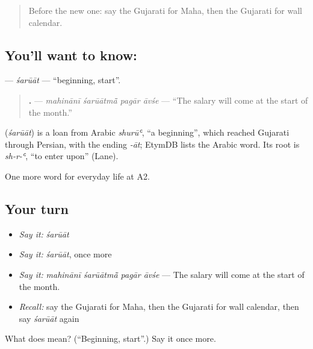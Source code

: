 \begin{quote}
Before the new one: say the Gujarati for Maha, then the Gujarati for wall calendar.
\end{quote}

\subsection*{You'll want to know: }
\textbf{} — \emph{śarūāt} — \textquotedblleft{}beginning, start\textquotedblright{}.

\begin{quote}
\textbf{   .} — \emph{mahinānī śarūātmā̃ pagār āvśe} — \textquotedblleft{}The salary will come at the start of the month.\textquotedblright{}
\end{quote}

\begin{cousinweb}
\textbf{} (\emph{śarūāt}) is a loan from Arabic \emph{shurūʿ}, \textquotedblleft{}a beginning\textquotedblright{}, which reached Gujarati through Persian, with the ending \emph{-āt}; EtymDB lists the Arabic word. Its root is \emph{sh-r-ʿ}, \textquotedblleft{}to enter upon\textquotedblright{} (Lane).
\end{cousinweb}

\begin{grammarlens}[title={What you've built}]
One more word for everyday life at A2.
\end{grammarlens}

\subsection*{Your turn}
\begin{itemize}
\raggedright
  \item \emph{Say it:} \emph{śarūāt}
  \item \emph{Say it:} \emph{śarūāt}, once more
  \item \emph{Say it:} \emph{mahinānī śarūātmā̃ pagār āvśe} — The salary will come at the start of the month.
  \item \emph{Recall:} say the Gujarati for Maha, then the Gujarati for wall calendar, then say \emph{śarūāt} again
\end{itemize}

\begin{tcolorbox}[breakable,colback=teal!4,colframe=teal!35!black,title={Before you move on}]
What does  mean? (\textquotedblleft{}Beginning, start\textquotedblright{}.) Say it once more.
\end{tcolorbox}
